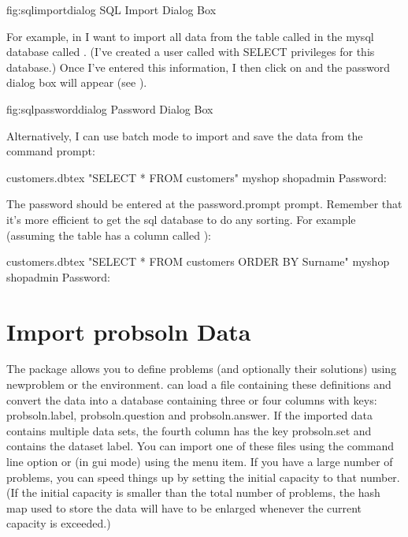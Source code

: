 \FloatFig
 {fig:sqlimportdialog}
 {%
 }
 {SQL Import Dialog Box}


   For example, in  I want to import all
   data from the table called  in the \gls{mysql}
   database called . (I've created a user called
    with SELECT privileges for this database.) Once I've 
   entered this information,
   I then click on  and the password
   dialog box will appear (see ).

\FloatFig
 {fig:sqlpassworddialog}
 {%
 }
 {Password Dialog Box}

   Alternatively, I can use batch mode to import and save the data 
   from the command prompt:

\begin{terminal}
  customers.dbtex  "SELECT * FROM customers" \continueline
{} myshop  shopadmin
Password:
\end{terminal}

   \ContExplan The password should be entered at the \gls{password.prompt}
   prompt. Remember that it's more efficient to get the \gls{sql}
   database to do any sorting. For example (assuming the table has 
   a column called ):
\begin{terminal}
  customers.dbtex  "SELECT * FROM customers ORDER BY \continueline
Surname"  myshop  shopadmin
Password:
\end{terminal}

\section{Import probsoln Data}\label{sec:importprobsoln}

   The  package allows you to define problems (and 
   optionally their solutions) using \gls{newproblem} or the
    environment.  can load a file
   containing these definitions and convert the  data
   into a  database containing three or four columns
   with keys: \gls{probsoln.label}, 
   \gls{probsoln.question} and
   \gls{probsoln.answer}. If the imported data contains
   multiple  data sets, the fourth column has the
   key \gls{probsoln.set} and contains the dataset label. 
   You can import one of these
   files using the  command line option or (in
   \gls{gui} mode) using the 
   menu item. If you have a large number of problems, you can speed things
   up by setting the initial capacity to that number. (If the initial
   capacity is smaller than the total number of problems, the hash map
   used to store the data will have to be enlarged whenever the current
   capacity is exceeded.)

